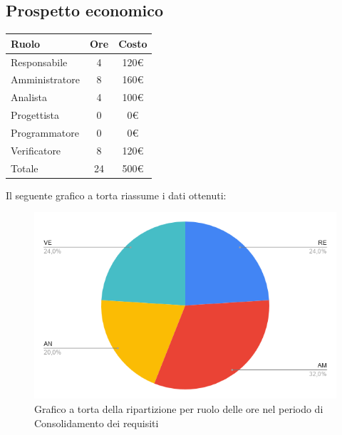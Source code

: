 {{{\subsection{Prospetto economico}\label{PreventivoFaseDiConsolidamentoDeiRequisitiProspettoEconomico}
\quad
\def\tabularxcolumn#1{m{#1}}
{	
	\begin{center}
		\renewcommand{\arraystretch}{1.4}
		\begin{tabularx}{7cm}{|X|c|c|}
			\hline
			\rowcolor{airforceblue}
			\textbf{Ruolo} & \textbf{Ore} & \textbf{Costo}\\
			\hline
			Responsabile & 4 & 120\euro\\
			\hline
			Amministratore & 8 & 160\euro\\
			\hline
			Analista & 4 & 100\euro\\
			\hline
			Progettista & 0 & 0\euro\\
			\hline
			Programmatore & 0 & 0\euro\\
			\hline
			Verificatore & 8 & 120\euro\\
			\hline
			Totale & 24 & 500\euro\\
			\hline
		\end{tabularx}
	\end{center}

Il seguente grafico a torta riassume i dati ottenuti:
\begin{figure}[!ht]
	\begin{center}
		\includegraphics[width=0.8\linewidth]{../immagini/pdp/torta_consolidamento_requisiti.png}
		\caption{Grafico a torta della ripartizione per ruolo delle ore nel periodo di Consolidamento
			dei requisiti}
	\end{center}
\end{figure}

}}}}
